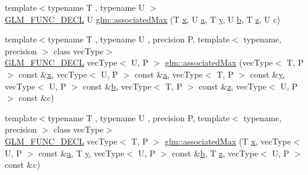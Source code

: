 \begin{DoxyCompactItemize}
\item 
{\footnotesize template$<$typename T , typename U $>$ }\\\mbox{\hyperlink{setup_8hpp_ab2d052de21a70539923e9bcbf6e83a51}{G\+L\+M\+\_\+\+F\+U\+N\+C\+\_\+\+D\+E\+CL}} U \mbox{\hyperlink{group__gtx__associated__min__max_gaec891e363d91abbf3a4443cf2f652209}{glm\+::associated\+Max}} (T \mbox{\hyperlink{glad_8h_a92d0386e5c19fb81ea88c9f99644ab1d}{x}}, U \mbox{\hyperlink{glad_8h_ac8729153468b5dcf13f971b21d84d4e5}{a}}, T \mbox{\hyperlink{glad_8h_a66ddd433d2cacfe27f5906b7e86faeed}{y}}, U \mbox{\hyperlink{glad_8h_a6eba317e3cf44d6d26c04a5a8f197dcb}{b}}, T \mbox{\hyperlink{glad_8h_acb78bf1972d3eaf07da34ff2e0a2f133}{z}}, U c)
\item 
{\footnotesize template$<$typename T , typename U , precision P, template$<$ typename, precision $>$ class vec\+Type$>$ }\\\mbox{\hyperlink{setup_8hpp_ab2d052de21a70539923e9bcbf6e83a51}{G\+L\+M\+\_\+\+F\+U\+N\+C\+\_\+\+D\+E\+CL}} vec\+Type$<$ U, P $>$ \mbox{\hyperlink{group__gtx__associated__min__max_ga065a0c1eb7837118ef79be88dfd78487}{glm\+::associated\+Max}} (vec\+Type$<$ T, P $>$ const \&\mbox{\hyperlink{glad_8h_a92d0386e5c19fb81ea88c9f99644ab1d}{x}}, vec\+Type$<$ U, P $>$ const \&\mbox{\hyperlink{glad_8h_ac8729153468b5dcf13f971b21d84d4e5}{a}}, vec\+Type$<$ T, P $>$ const \&\mbox{\hyperlink{glad_8h_a66ddd433d2cacfe27f5906b7e86faeed}{y}}, vec\+Type$<$ U, P $>$ const \&\mbox{\hyperlink{glad_8h_a6eba317e3cf44d6d26c04a5a8f197dcb}{b}}, vec\+Type$<$ T, P $>$ const \&\mbox{\hyperlink{glad_8h_acb78bf1972d3eaf07da34ff2e0a2f133}{z}}, vec\+Type$<$ U, P $>$ const \&c)
\item 
{\footnotesize template$<$typename T , typename U , precision P, template$<$ typename, precision $>$ class vec\+Type$>$ }\\\mbox{\hyperlink{setup_8hpp_ab2d052de21a70539923e9bcbf6e83a51}{G\+L\+M\+\_\+\+F\+U\+N\+C\+\_\+\+D\+E\+CL}} vec\+Type$<$ T, P $>$ \mbox{\hyperlink{group__gtx__associated__min__max_ga553431a468e251623408603bcb51c9cb}{glm\+::associated\+Max}} (T \mbox{\hyperlink{glad_8h_a92d0386e5c19fb81ea88c9f99644ab1d}{x}}, vec\+Type$<$ U, P $>$ const \&\mbox{\hyperlink{glad_8h_ac8729153468b5dcf13f971b21d84d4e5}{a}}, T \mbox{\hyperlink{glad_8h_a66ddd433d2cacfe27f5906b7e86faeed}{y}}, vec\+Type$<$ U, P $>$ const \&\mbox{\hyperlink{glad_8h_a6eba317e3cf44d6d26c04a5a8f197dcb}{b}}, T \mbox{\hyperlink{glad_8h_acb78bf1972d3eaf07da34ff2e0a2f133}{z}}, vec\+Type$<$ U, P $>$ const \&c)
\item 

\end{DoxyCompactItemize}
